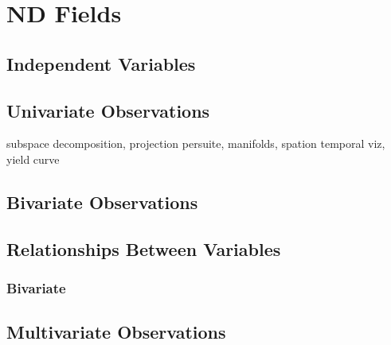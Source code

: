 \documentclass[../main.tex]{subfiles}
\begin{document}
\section{ND Fields}

\subsection{Independent Variables}
\subsection{Univariate Observations}
subspace decomposition, projection persuite, manifolds,
spation temporal viz, yield curve
\subsection{Bivariate Observations}


\subsection{Relationships Between Variables}
\subsubsection{Bivariate}
\subsection{Multivariate Observations}
\end{document}
